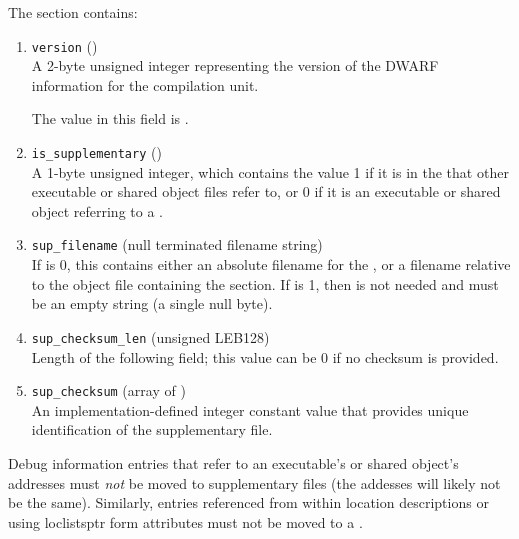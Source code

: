The \dotdebugsup{} section contains:
\begin{enumerate}[1. ]
\item \texttt{version} (\HFTuhalf) \\
A 2-byte unsigned integer representing the version of the DWARF
information for the compilation unit. 

The value in this field is \versiondotdebugsup.

\item \texttt{is\_supplementary} (\HFTubyte) \\
A 1-byte unsigned integer, which contains the value 1 if it is
in the  that other executable or 
shared object files refer to, or 0 if it is an executable or shared object 
referring to a .

\item \texttt{sup\_filename} (null terminated filename string) \\
If  is 0, this contains either an absolute 
filename for the , or a filename 
relative to the object file containing the \dotdebugsup{} section.  
If  is 1, then 
is not needed and must be an empty string (a single null byte).

\item \texttt{sup\_checksum\_len} (unsigned LEB128) \\
Length of the following  field; 
this value can be 0 if no checksum is provided.

\item \texttt{sup\_checksum} (array of \HFTubyte) \\
An implementation-defined integer constant value that
provides unique identification of the supplementary file.

\end{enumerate}

Debug information entries that refer to an executable's or shared
object's addresses must \emph{not} be moved to supplementary files 
(the addesses will likely not be the same). Similarly,
entries referenced from within location descriptions or using loclistsptr
form attributes must not be moved to a .

